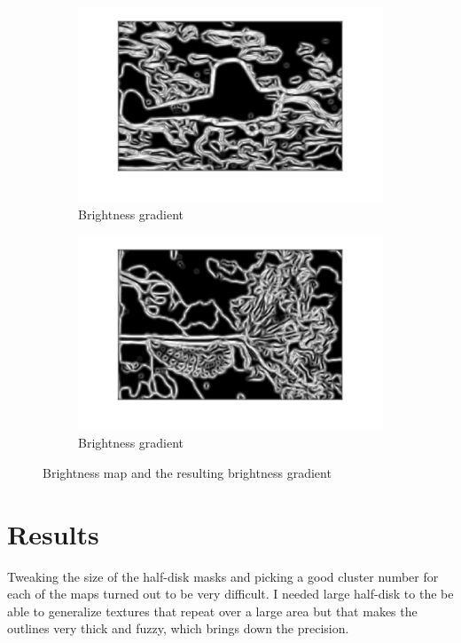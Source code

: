 \documentclass[12pt]{article}
\begin{document}
\begin{figure}
    \begin{subfigure}[t]{.49\textwidth}
        \centering
        \includegraphics[width=\linewidth]{img/cg1}
        \caption{Brightness gradient}
    \end{subfigure}\hfill
    \begin{subfigure}[t]{.49\textwidth}
        \centering
        \includegraphics[width=\linewidth]{img/cg2}
        \caption{Brightness gradient}
    \end{subfigure}
    \caption{Brightness map and the resulting brightness gradient}
    \label{fig_bg}
\end{figure}

\section{Results}

Tweaking the size of the half-disk masks and picking a good cluster number for each of the maps turned out to be very difficult. I needed large half-disk to the be able to generalize textures that repeat over a large area but that makes the outlines very thick and fuzzy, which brings down the precision.
\end{document}
